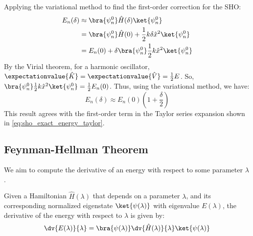 \begin{example}
  Applying the variational method to find the first-order
  correction for the SHO:
  \begin{align} \label{eq:sho_variational_first_order}
    E_n(\delta) &\approx \bra {\psi_n^0}\hat H (\delta) \ket{\psi_n^0} \\
    &=\bra {\psi_n^0}\hat H (0) + \frac{1}{2}k\delta\hat
    x^2\ket{\psi_n^0} \notag \\
    &=E_n(0) + \delta \bra{\psi_n^0}\frac{1}{2}k\hat
    x^2\ket{\psi_n^0} \notag
  \end{align}
  By the Virial theorem, for a harmonic oscillator,
  $\expectationvalue{\hat K} = \expectationvalue{\hat V} =
  \frac{1}{2}E$. So, $\bra{\psi_n^0}\frac{1}{2}k\hat
  x^2\ket{\psi_n^0} = \frac{1}{2}E_n(0)$. Thus, using the
  variational method, we have:
  \begin{equation}
    E_n(\delta) \approx E_n(0)\left( 1 + \frac{\delta}{2}\right)
  \end{equation}
  This result agrees with the first-order term in the Taylor series
  expansion shown in \eqref{eq:sho_exact_energy_taylor}.
\end{example}

\hr
\subsection{Feynman-Hellman Theorem}
We aim to compute the derivative of an energy with respect to some
parameter $\lambda$.

\begin{theorem}
  Given a Hamiltonian $\hat H(\lambda)$ that depends on a parameter
  $\lambda$, and its corresponding normalized eigenstate
  $\ket{\psi(\lambda)}$ with eigenvalue $E(\lambda)$, the
  derivative of the energy with respect to $\lambda$ is given by:
  \begin{equation} \label{eq:feynman_hellman_theorem}
    \dv{E(\lambda)}{\lambda} = \bra{\psi(\lambda)} \dv{\hat
    H(\lambda)}{\lambda} \ket{\psi(\lambda)}
  \end{equation}
\end{theorem}

